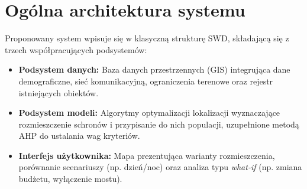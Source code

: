 \documentclass[12pt,a4paper]{article}
\begin{document}
\section{Ogólna architektura systemu}
Proponowany system wpisuje się w klasyczną strukturę SWD, składającą się z trzech współpracujących podsystemów:
\begin{itemize}
    \item \textbf{Podsystem danych:} Baza danych przestrzennych (GIS) integrująca dane demograficzne, sieć komunikacyjną, ograniczenia terenowe oraz rejestr istniejących obiektów.
    \item \textbf{Podsystem modeli:} Algorytmy optymalizacji lokalizacji wyznaczające rozmieszczenie schronów i przypisanie do nich populacji, uzupełnione metodą AHP do ustalania wag kryteriów.
    \item \textbf{Interfejs użytkownika:} Mapa prezentująca warianty rozmieszczenia, porównanie scenariuszy (np. dzień/noc) oraz analiza typu \textit{what-if} (np. zmiana budżetu, wyłączenie mostu).
\end{itemize}
\end{document}
